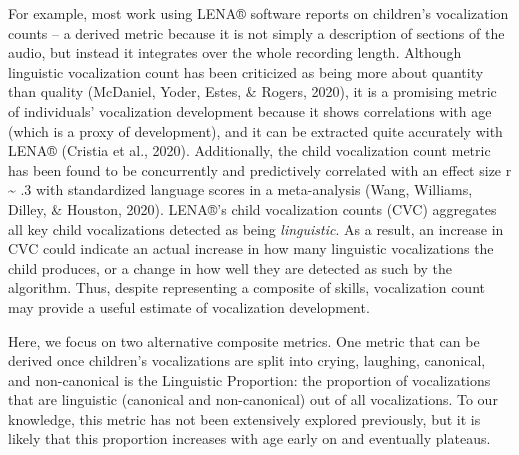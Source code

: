 \documentclass[english,,man]{apa6}
\begin{document}
For example, most work using LENA® software reports on children's vocalization counts -- a derived metric because it is not simply a description of sections of the audio, but instead it integrates over the whole recording length. Although linguistic vocalization count has been criticized as being more about quantity than quality (McDaniel, Yoder, Estes, \& Rogers, 2020), it is a promising metric of individuals' vocalization development because it shows correlations with age (which is a proxy of development), and it can be extracted quite accurately with LENA® (Cristia et al., 2020). Additionally, the child vocalization count metric has been found to be concurrently and predictively correlated with an effect size r \textasciitilde{} .3 with standardized language scores in a meta-analysis (Wang, Williams, Dilley, \& Houston, 2020). LENA®'s child vocalization counts (CVC) aggregates all key child vocalizations detected as being \emph{linguistic}. As a result, an increase in CVC could indicate an actual increase in how many linguistic vocalizations the child produces, or a change in how well they are detected as such by the algorithm. Thus, despite representing a composite of skills, vocalization count may provide a useful estimate of vocalization development.

Here, we focus on two alternative composite metrics. One metric that can be derived once children's vocalizations are split into crying, laughing, canonical, and non-canonical is the Linguistic Proportion: the proportion of vocalizations that are linguistic (canonical and non-canonical) out of all vocalizations. To our knowledge, this metric has not been extensively explored previously, but it is likely that this proportion increases with age early on and eventually plateaus.
\end{document}
